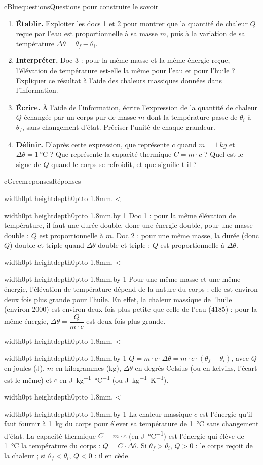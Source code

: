 \documentclass[11pt,a4paper]{article}
\newcommand{\kw}[1]{{\sffamily\bfseries\color{cBlue}#1}}   %
\newif\ifeleve
\newlength{\interligne}\setlength{\interligne}{7mm}
\newlength{\replen}
\newcommand{\pointilles}{{\color{cInk2!60}\leaders\hbox to 1.8mm{\hss.\hss}\hfill}\kern0pt}
\newcommand{\lignes}[1]{\leavevmode\vrule width0pt height\dimexpr\interligne-1mm\relax depth0pt\pointilles
  \lgn=1 \loop\ifnum\lgn<#1 \par\nointerlineskip\noindent\vrule width0pt height\interligne depth0pt\pointilles\advance\lgn by 1 \repeat}
\newcommand{\rep}[1]{%
  \ifeleve
    \sbox{\repbox}{\parbox{\linewidth}{#1}}%
    \replen=\dimexpr\ht\repbox+\dp\repbox\relax
    \repn=\numexpr\replen/\baselineskip+1\relax
    \ifnum\repn<2 \repn=2\fi
    \edef\nblignes{\the\repn}\lignes{\nblignes}%
  \else #1\fi}
\newcommand{\titrereponses}{\ifeleve Mes réponses\else Réponses\fi}
\newcommand{\cu}{\unit{J.kg^{-1}.\degreeCelsius^{-1}}}
\newcommand{\muu}{\unit{J.\degreeCelsius^{-1}}}
\newcommand{\dC}[1]{\qty{#1}{\degreeCelsius}}
\begin{document}
\begin{rub}{cBlue}{questions}{Questions pour construire le savoir}
\begin{enumerate}
  \item \kw{Établir.} Exploiter les docs 1 et 2 pour montrer que la quantité de chaleur $Q$ reçue par l’eau est proportionnelle à sa masse $m$, puis à la variation de sa température $\Delta\theta = \theta_f - \theta_i$.
  \item \kw{Interpréter.} Doc 3 : pour la même masse et la même énergie reçue, l’élévation de température est-elle la même pour l’eau et pour l’huile ? Expliquer ce résultat à l’aide des chaleurs massiques données dans l’information.
  \item \kw{Écrire.} À l’aide de l’information, écrire l’expression de la quantité de chaleur $Q$ échangée par un corps pur de masse $m$ dont la température passe de $\theta_i$ à $\theta_f$, sans changement d’état. Préciser l’unité de chaque grandeur.
  \item \kw{Définir.} D’après cette expression, que représente $c$ quand $m = \qty{1}{kg}$ et $\Delta\theta = \dC{1}$ ? Que représente la capacité thermique $C = m\cdot c$ ? Quel est le signe de $Q$ quand le corps se refroidit, et que signifie-t-il ?
\end{enumerate}
\end{rub}

\begin{rub}{cGreen}{reponses}{\titrereponses}
\begin{reps}
  \item \rep{Doc 1 : pour la même élévation de température, il faut une durée double, donc une énergie double, pour une masse double : $Q$ est proportionnelle à $m$. Doc 2 : pour une même masse, la durée (donc $Q$) double et triple quand $\Delta\theta$ double et triple : $Q$ est proportionnelle à $\Delta\theta$.}
  \item \rep{Pour une même masse et une même énergie, l’élévation de température dépend de la nature du corps : elle est environ deux fois plus grande pour l’huile. En effet, la chaleur massique de l’huile (environ \num{2000}) est environ deux fois plus petite que celle de l’eau (\num{4185}) : pour la même énergie, $\Delta\theta = \dfrac{Q}{m\cdot c}$ est deux fois plus grande.}
  \item \rep{$Q = m\cdot c\cdot\Delta\theta = m\cdot c\cdot(\theta_f - \theta_i)$, avec $Q$ en joules (J), $m$ en kilogrammes (kg), $\Delta\theta$ en degrés Celsius (ou en kelvins, l’écart est le même) et $c$ en \cu{} (ou \unit{J.kg^{-1}.K^{-1}}).}
  \item \rep{La chaleur massique $c$ est l’énergie qu’il faut fournir à \qty{1}{kg} du corps pour élever sa température de \dC{1} sans changement d’état. La capacité thermique $C = m\cdot c$ (en \muu) est l’énergie qui élève de \dC{1} la température du corps : $Q = C\cdot\Delta\theta$. Si $\theta_f > \theta_i$, $Q > 0$ : le corps reçoit de la chaleur ; si $\theta_f < \theta_i$, $Q < 0$ : il en cède.}
\end{reps}
\end{rub}
\end{document}
